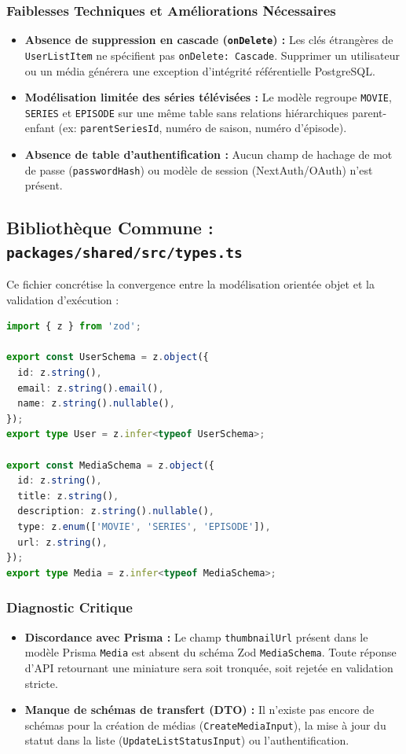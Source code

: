 \documentclass[11pt,a4paper]{article}
\begin{document}
\subsubsection{Faiblesses Techniques et Améliorations Nécessaires}
\begin{itemize}
    \item \textbf{Absence de suppression en cascade (\texttt{onDelete}) :} Les clés étrangères de \texttt{UserListItem} ne spécifient pas \texttt{onDelete: Cascade}. Supprimer un utilisateur ou un média générera une exception d'intégrité référentielle PostgreSQL.
    \item \textbf{Modélisation limitée des séries télévisées :} Le modèle regroupe \texttt{MOVIE}, \texttt{SERIES} et \texttt{EPISODE} sur une même table sans relations hiérarchiques parent-enfant (ex: \texttt{parentSeriesId}, numéro de saison, numéro d'épisode).
    \item \textbf{Absence de table d'authentification :} Aucun champ de hachage de mot de passe (\texttt{passwordHash}) ou modèle de session (NextAuth/OAuth) n'est présent.
\end{itemize}

\subsection{Bibliothèque Commune : \texttt{packages/shared/src/types.ts}}
Ce fichier concrétise la convergence entre la modélisation orientée objet et la validation d'exécution :

\begin{lstlisting}[language=TypeScript, caption={Schémas Zod et inférence de types TypeScript}]
import { z } from 'zod';

export const UserSchema = z.object({
  id: z.string(),
  email: z.string().email(),
  name: z.string().nullable(),
});
export type User = z.infer<typeof UserSchema>;

export const MediaSchema = z.object({
  id: z.string(),
  title: z.string(),
  description: z.string().nullable(),
  type: z.enum(['MOVIE', 'SERIES', 'EPISODE']),
  url: z.string(),
});
export type Media = z.infer<typeof MediaSchema>;
\end{lstlisting}

\subsubsection{Diagnostic Critique}
\begin{itemize}
    \item \textbf{Discordance avec Prisma :} Le champ \texttt{thumbnailUrl} présent dans le modèle Prisma \texttt{Media} est absent du schéma Zod \texttt{MediaSchema}. Toute réponse d'API retournant une miniature sera soit tronquée, soit rejetée en validation stricte.
    \item \textbf{Manque de schémas de transfert (DTO) :} Il n'existe pas encore de schémas pour la création de médias (\texttt{CreateMediaInput}), la mise à jour du statut dans la liste (\texttt{UpdateListStatusInput}) ou l'authentification.
\end{itemize}
\end{document}
